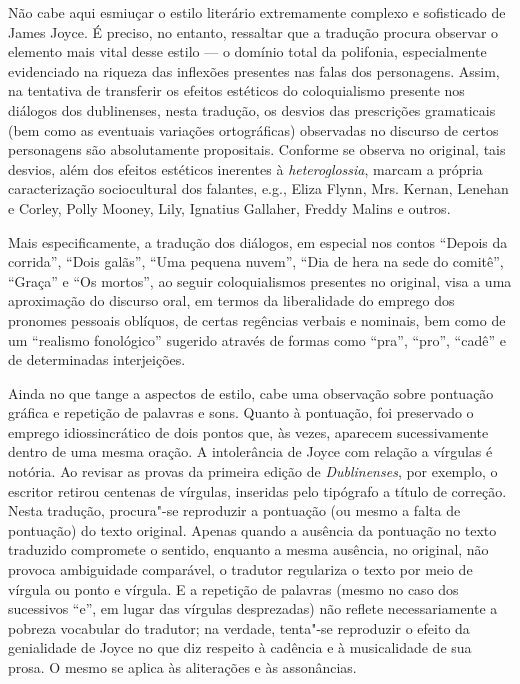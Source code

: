 Não cabe aqui esmiuçar o estilo literário extremamente complexo e sofisticado de
James Joyce. É preciso, no entanto, ressaltar que a tradução procura observar o
elemento mais vital desse estilo --- o domínio total da polifonia, especialmente
evidenciado na riqueza das inflexões presentes nas falas dos personagens.
Assim, na tentativa de transferir os efeitos estéticos do coloquialismo
presente nos diálogos dos dublinenses, nesta tradução, os desvios das
prescrições gramaticais (bem como as eventuais variações ortográficas)
observadas no discurso de certos personagens são absolutamente propositais.
Conforme se observa no original, tais desvios, além dos efeitos estéticos
inerentes à \textit{heteroglossia}, marcam a própria caracterização
sociocultural dos falantes, e.g., Eliza Flynn, Mrs. Kernan, Lenehan e Corley,
Polly Mooney, Lily, Ignatius Gallaher, Freddy Malins e outros.

Mais especificamente, a tradução dos diálogos, em especial nos contos “Depois da
corrida”, “Dois galãs”, “Uma pequena nuvem”, “Dia de hera na sede do comitê”,
“Graça” e “Os mortos”, ao seguir coloquialismos presentes no original, visa a
uma aproximação do discurso oral, em termos da liberalidade do emprego dos
pronomes pessoais oblíquos, de certas regências verbais e nominais, bem como de
um “realismo fonológico” sugerido através de formas como “pra”, “pro”, “cadê” e
de determinadas interjeições.

Ainda no que tange a aspectos de estilo, cabe uma observação sobre pontuação
gráfica e repetição de palavras e sons. Quanto à pontuação, foi preservado o
emprego idiossincrático de dois pontos que, às vezes, aparecem sucessivamente
dentro de uma mesma oração. A intolerância de Joyce com relação a vírgulas é
notória. Ao revisar as provas da primeira edição de \textit{Dublinenses}, por
exemplo, o escritor retirou centenas de vírgulas, inseridas pelo tipógrafo a
título de correção. Nesta tradução, procura"-se reproduzir a pontuação (ou mesmo
a falta de pontuação) do texto original. Apenas quando a ausência da pontuação
no texto traduzido compromete o sentido, enquanto a mesma ausência, no
original, não provoca ambiguidade comparável, o tradutor regulariza o texto por
meio de vírgula ou ponto e vírgula.  E a repetição de palavras (mesmo no caso
dos sucessivos “e”, em lugar das vírgulas desprezadas) não reflete
necessariamente a pobreza vocabular do tradutor; na verdade, tenta"-se
reproduzir o efeito da genialidade de Joyce no que diz respeito à cadência e à
musicalidade de sua prosa. O mesmo se aplica às aliterações e às assonâncias.

